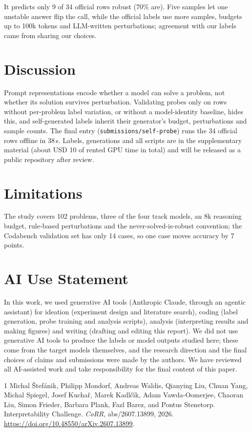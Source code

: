 \documentclass{article}
\begin{document}
It predicts only 9 of 34 official rows robust (70\% are). Five samples let one unstable answer flip the call, while the official labels use more samples, budgets up to 100k tokens and LLM-written perturbations; agreement with our labels came from sharing our choices.

\section{Discussion}
Prompt representations encode whether a model can solve a problem, not whether its solution survives perturbation. Validating probes only on rows without per-problem label variation, or without a model-identity baseline, hides this, and self-generated labels inherit their generator's budget, perturbations and sample counts. The final entry (\texttt{submissions/self-probe}) runs the 34 official rows offline in 38\,s. Labels, generations and all scripts are in the supplementary material (about USD 10 of rented GPU time in total) and will be released as a public repository after review.

\section*{Limitations}
The study covers 102 problems, three of the four track models, an 8k reasoning budget, rule-based perturbations and the never-solved-is-robust convention; the Codabench validation set has only 14 cases, so one case moves accuracy by 7 points.

\section*{AI Use Statement}
In this work, we used generative AI tools (Anthropic Claude, through an agentic assistant) for ideation (experiment design and literature search), coding (label generation, probe training and analysis scripts), analysis (interpreting results and making figures) and writing (drafting and editing this report). We did not use generative AI tools to produce the labels or model outputs studied here; these come from the target models themselves, and the research direction and the final choices of claims and submissions were made by the authors. We have reviewed all AI-assisted work and take responsibility for the final content of this paper.

\begin{thebibliography}{1}
Michal {\v{S}}tef{\'{a}}nik, Philipp Mondorf, Andreas Waldis, Qianying Liu, Chuan Yang, Michal Spiegel, Josef Kucha{\v{r}}, Marek Kadl{\v{c}}{\'{\i}}k, Adam Vawda{-}Oomerjee, Chaoran Liu, Simon Frieder, Barbara Plank, Fazl Barez, and Pontus Stenetorp.
 Interpretability Challenge.
\newblock \emph{CoRR}, abs/2607.13899, 2026.
\newblock \url{https://doi.org/10.48550/arXiv.2607.13899}.
\end{thebibliography}
\end{document}
